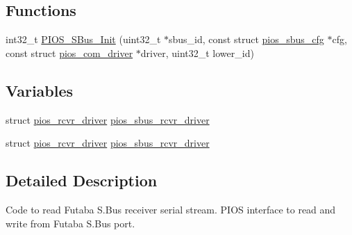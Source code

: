 \subsection*{\-Functions}
\begin{DoxyCompactItemize}
\item 
int32\-\_\-t \hyperlink{group___p_i_o_s___s_bus_gac93988726d12e4481b1ae236ab5fc8f5}{\-P\-I\-O\-S\-\_\-\-S\-Bus\-\_\-\-Init} (uint32\-\_\-t $\ast$sbus\-\_\-id, const struct \hyperlink{structpios__sbus__cfg}{pios\-\_\-sbus\-\_\-cfg} $\ast$cfg, const struct \hyperlink{structpios__com__driver}{pios\-\_\-com\-\_\-driver} $\ast$driver, uint32\-\_\-t lower\-\_\-id)
\end{DoxyCompactItemize}
\subsection*{\-Variables}
\begin{DoxyCompactItemize}
\item 
struct \hyperlink{structpios__rcvr__driver}{pios\-\_\-rcvr\-\_\-driver} \hyperlink{group___p_i_o_s___s_bus_gaaeb5483a0eaa4e4221011d4a83831876}{pios\-\_\-sbus\-\_\-rcvr\-\_\-driver}
\item 
struct \hyperlink{structpios__rcvr__driver}{pios\-\_\-rcvr\-\_\-driver} \hyperlink{group___p_i_o_s___s_bus_gaaeb5483a0eaa4e4221011d4a83831876}{pios\-\_\-sbus\-\_\-rcvr\-\_\-driver}
\end{DoxyCompactItemize}


\subsection{\-Detailed \-Description}
\-Code to read \-Futaba \-S.\-Bus receiver serial stream. \-P\-I\-O\-S interface to read and write from \-Futaba \-S.\-Bus port. 

